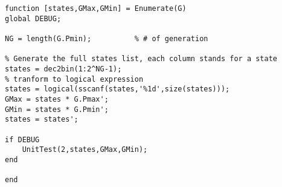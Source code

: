 \begin{verbatim}
function [states,GMax,GMin] = Enumerate(G)
global DEBUG;

NG = length(G.Pmin);          % # of generation

% Generate the full states list, each column stands for a state
states = dec2bin(1:2^NG-1);
% tranform to logical expression
states = logical(sscanf(states,'%1d',size(states)));
GMax = states * G.Pmax';
GMin = states * G.Pmin';
states = states';

if DEBUG
    UnitTest(2,states,GMax,GMin);
end

end
\end{verbatim}

